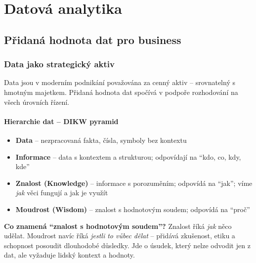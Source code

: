 \section{Datová analytika}

\subsection{Přidaná hodnota dat pro business}

\subsubsection{Data jako strategický aktiv}

Data jsou v moderním podnikání považována za cenný aktiv -- srovnatelný s hmotným majetkem.
Přidaná hodnota dat spočívá v podpoře rozhodování na všech úrovních řízení.

\paragraph{Hierarchie dat -- DIKW pyramid}
\begin{itemize}
  \item \textbf{Data} -- nezpracovaná fakta, čísla, symboly bez kontextu
  \item \textbf{Informace} -- data s kontextem a strukturou; odpovídají na ``kdo, co, kdy, kde''
  \item \textbf{Znalost (Knowledge)} -- informace s porozuměním; odpovídá na ``jak'';
    víme \textit{jak} věci fungují a jak je využít
  \item \textbf{Moudrost (Wisdom)} -- znalost s hodnotovým soudem; odpovídá na ``proč''
\end{itemize}

\textbf{Co znamená ``znalost s hodnotovým soudem''?}
Znalost říká \textit{jak} něco udělat. Moudrost navíc říká \textit{jestli to vůbec dělat} --
přidává zkušenost, etiku a schopnost posoudit dlouhodobé důsledky. Jde o úsudek, který
nelze odvodit jen z dat, ale vyžaduje lidský kontext a hodnoty.

